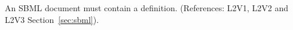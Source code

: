 An SBML document must contain a \Model definition.  (References:
L2V1, L2V2 and L2V3 Section~\ref{sec:sbml}).
